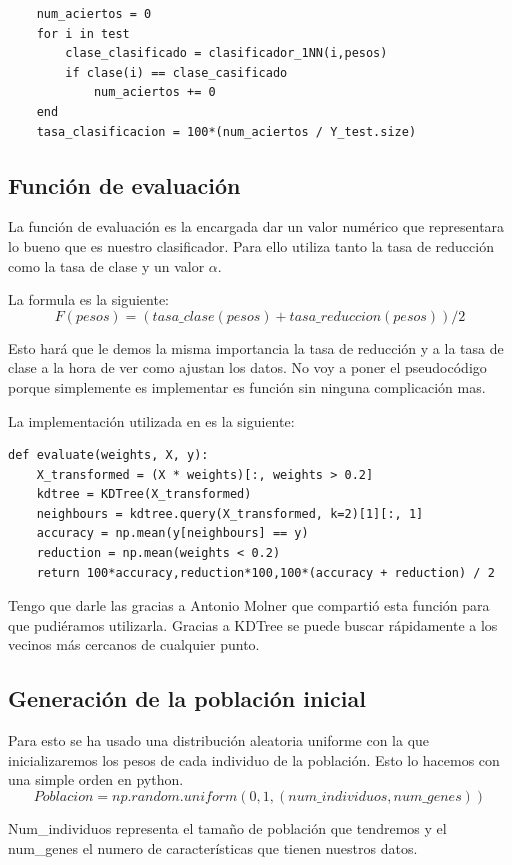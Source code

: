 \documentclass[titlepage]{article}
\begin{document}
	\begin{lstlisting}
	num_aciertos = 0
	for i in test
		clase_clasificado = clasificador_1NN(i,pesos)
		if clase(i) == clase_casificado
			num_aciertos += 0
	end
	tasa_clasificacion = 100*(num_aciertos / Y_test.size)
	\end{lstlisting}
	
	\subsection{Función de evaluación}
	La función de evaluación es la encargada dar un valor numérico que representara lo bueno que es nuestro clasificador. Para ello utiliza tanto la tasa de reducción como la tasa de clase y un valor $\alpha$. 
	
	La formula es la siguiente:
	$$
	F(pesos) = (tasa\_clase(pesos) + tasa\_reduccion(pesos)) / 2
	$$ 
	
	 Esto hará que le demos la misma importancia la tasa de reducción y a la tasa de clase a la hora de ver como ajustan los datos. No voy a poner el pseudocódigo porque simplemente es implementar es función sin ninguna complicación mas.
	
	La implementación utilizada en es la siguiente:
	
	\begin{lstlisting}
def evaluate(weights, X, y):
	X_transformed = (X * weights)[:, weights > 0.2]
	kdtree = KDTree(X_transformed)
	neighbours = kdtree.query(X_transformed, k=2)[1][:, 1]
	accuracy = np.mean(y[neighbours] == y)
	reduction = np.mean(weights < 0.2)
	return 100*accuracy,reduction*100,100*(accuracy + reduction) / 2
	\end{lstlisting}
	 
	 Tengo que darle las gracias a Antonio Molner que compartió esta función para que pudiéramos utilizarla. Gracias a KDTree se puede buscar rápidamente a los vecinos más cercanos de cualquier punto.
	
	\subsection{Generación de la población inicial}
	
	Para esto se ha usado una distribución aleatoria uniforme con la que  inicializaremos los pesos de cada individuo de la población. 
	Esto lo hacemos con una simple orden en python. 
	$$
		Poblacion = np.random.uniform(0,1,(num\_individuos, num\_genes))
	$$ 
	
	Num\_individuos representa el tamaño de población que tendremos y el num\_genes el numero de características que tienen nuestros datos.
	
\end{document}
